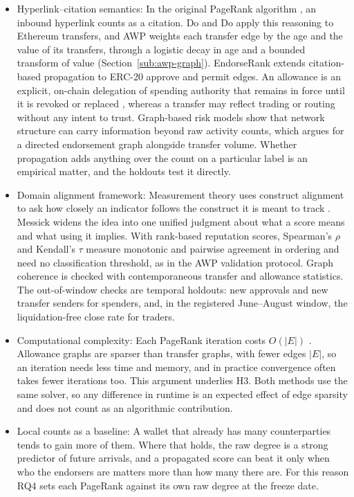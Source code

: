 \begin{itemize}
\item Hyperlink--citation semantics: In the original PageRank algorithm , an inbound hyperlink counts as a citation. Do and Do apply this reasoning to Ethereum transfers, and AWP weights each transfer edge by the age and the value of its transfers, through a logistic decay in age and a bounded transform of value (Section~\ref{sub:awp-graph}). EndorseRank extends citation-based propagation to ERC-20 approve and permit edges. An allowance is an explicit, on-chain delegation of spending authority that remains in force until it is revoked or replaced , whereas a transfer may reflect trading or routing without any intent to trust. Graph-based risk models  show that network structure can carry information beyond raw activity counts, which argues for a directed endorsement graph alongside transfer volume. Whether propagation adds anything over the count on a particular label is an empirical matter, and the holdouts test it directly.

\item Domain alignment framework: Measurement theory uses construct alignment to ask how closely an indicator follows the construct it is meant to track . Messick widens the idea into one unified judgment about what a score means and what using it implies. With rank-based reputation scores, Spearman's $\rho$ and Kendall's $\tau$ measure monotonic and pairwise agreement in ordering and need no classification threshold, as in the AWP validation protocol. Graph coherence is checked with contemporaneous transfer and allowance statistics. The out-of-window checks are temporal holdouts: new approvals and new transfer senders for spenders, and, in the registered June--August window, the liquidation-free close rate for traders.

\item Computational complexity: Each PageRank iteration costs $O(|E|)$ . Allowance graphs are sparser than transfer graphs, with fewer edges $|E|$, so an iteration needs less time and memory, and in practice convergence often takes fewer iterations too. This argument underlies H3. Both methods use the same solver, so any difference in runtime is an expected effect of edge sparsity and does not count as an algorithmic contribution.

\item Local counts as a baseline: A wallet that already has many counterparties tends to gain more of them. Where that holds, the raw degree is a strong predictor of future arrivals, and a propagated score can beat it only when who the endorsers are matters more than how many there are. For this reason RQ4 sets each PageRank against its own raw degree at the freeze date.


\end{itemize}

